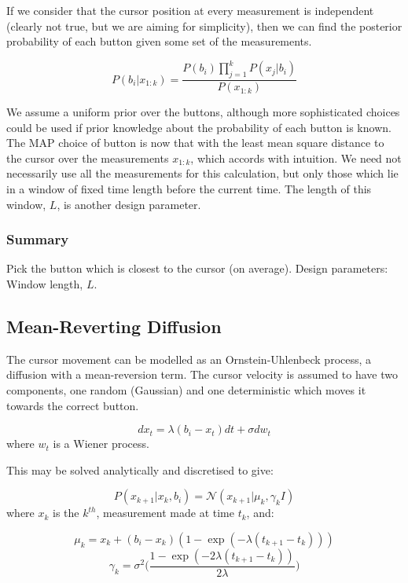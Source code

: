 If we consider that the cursor position at every measurement is independent (clearly not true, but we are aiming for simplicity), then we can find the posterior probability of each button given some set of the measurements.

\begin{equation}
P(b_i|x_{1:k}) = \frac{P(b_i)\prod_{j=1}^{k}{P(x_j| b_i)}}{P(x_{1:k})}
\end{equation}

We assume a uniform prior over the buttons, although more sophisticated choices could be used if prior knowledge about the probability of each button is known. The MAP choice of button is now that with the least mean square distance to the cursor over the measurements $x_{1:k}$, which accords with intuition. We need not necessarily use all the measurements for this calculation, but only those which lie in a window of fixed time length before the current time. The length of this window, $L$, is another design parameter.

\subsubsection*{Summary}
Pick the button which is closest to the cursor (on average).
Design parameters: Window length, $L$.



\subsection{Mean-Reverting Diffusion}
The cursor movement can be modelled as an Ornstein-Uhlenbeck process, a diffusion with a mean-reversion term. The cursor velocity is assumed to have two components, one random (Gaussian) and one deterministic which moves it towards the correct button.

\begin{equation}dx_t = \lambda (b_i - x_t)dt + \sigma dw_t\end{equation}
where $w_t$ is a Wiener process.

This may be solved analytically and discretised to give:

\begin{equation}P(x_{k+1}|x_{k}, b_i) = \mathcal{N} ( x_{k+1} | \mu_k, \gamma_k I)\end{equation}
where $x_k$ is the $k^{th}$, measurement made at time $t_k$, and:

\begin{equation}\mu_k = x_{k} + (b_i - x_k) (1-\exp(-\lambda (t_{k+1} - t_k)))\end{equation}
\begin{equation}\gamma_k = \sigma^2 \bigg (\frac{1-\exp(-2 \lambda (t_{k+1} - t_k))}{2 \lambda} \bigg )\end{equation}

